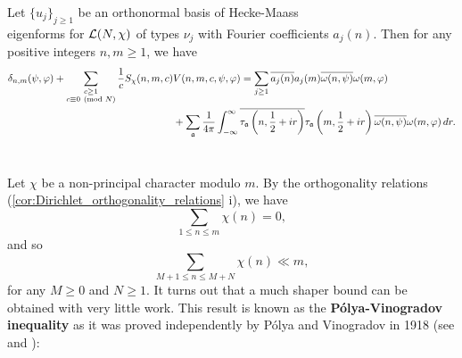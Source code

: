 \documentclass[12pt,oneside]{book}
\begin{document}
    \begin{theorem}
      Let $\{u_{j}\}_{j \ge 1}$ be an orthonormal basis of Hecke-Maass \\ eigenforms for $\mathcal{L}(N,\chi)$ of types $\nu_{j}$ with Fourier coefficients $a_{j}(n)$. Then for any positive integers $n,m \ge 1$, we have
      \begin{align*}
        \delta_{n,m}(\psi,\varphi)+\sum_{\substack{c \ge 1 \\ c \equiv 0 \ \left(\text{mod }N\right)}}\frac{1}{c}S_{\chi}(n,m,c)&V(n,m,c,\psi,\varphi) = \sum_{j \ge 1}\overline{a_{j}(n)}a_{j}(m)\overline{\omega(n,\psi)}\omega(m,\varphi) \\
        &+\sum_{\mathfrak{a}}\frac{1}{4\pi}\int_{-\infty}^{\infty}\overline{\tau_{\mathfrak{a}}\left(n,\frac{1}{2}+ir\right)}\tau_{\mathfrak{a}}\left(m,\frac{1}{2}+ir\right)\overline{\omega(n,\psi)}\omega(m,\varphi)\,dr.
      \end{align*}
    \end{theorem}
  \section{}
    Let $\chi$ be a non-principal character modulo $m$. By the orthogonality relations (\cref{cor:Dirichlet_orthogonality_relations} i), we have
    \[
      \sum_{1 \le n \le m}\chi(n) = 0,
    \]
    and so
    \[
      \sum_{M+1 \le n \le M+N}\chi(n) \ll m,
    \]
    for any $M \ge 0$ and $N \ge 1$. It turns out that a much shaper bound can be obtained with very little work. This result is known as the \textbf{P\'olya-Vinogradov inequality} as it was proved independently by P\'olya and Vinogradov in 1918 (see  and ):
\end{document}
